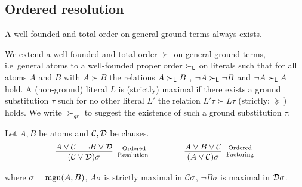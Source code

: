 \subsection{Ordered resolution}\label{sec:ordered:resolution}

\begin{lemma}A well-founded and total order on general ground terms always exists.\end{lemma}

\begin{definition}\label{def:orders-on-literals}
	We extend a well-founded and total order $\succ$ on general ground terms, 
	i.e~general atoms to a well-founded proper order $\succ_{\mathsf L}$ 
	on literals such that for all atoms $A$ and $B$ with $A\succ B$ 
	the relations $A\succ_{\mathsf L} B$ , 
	$\lnot A\succ_{\mathsf L}\lnot B$ and 
	$\lnot A\succ_{\mathsf L} A$ hold. 
	A (non-ground) literal $L$ is {\myem (strictly) maximal} if there exists a ground substitution $\tau$ 
	such for no other literal $L'$ the relation $L'\tau\succ L\tau$ (strictly: $\succcurlyeq$) holds.
	We write $\succ_{gr}$ to suggest the existence of such a ground substitution $\tau$.
\end{definition}

\begin{definition}\label{def:ordered:resolution} 
	Let $A, B$ be atoms and ${\mathcal C},{\mathcal D}$ be clauses.
	\begin{gather*}
	\infer
	[\text{Ordered}\atop\text{Resolution	}] 
	{(\mcC\lor\mcD)\sigma}
	{A\lor\mcC&\lnot B\lor\mcD}
	\qquad\qquad
	\infer
	[\text{Ordered}\atop\text{Factoring}] 
	{(A\lor\mcC)\sigma}
	{A\lor B\lor\mcC}
	\end{gather*}
	\begin{center}
		where $\sigma=\operatorname{mgu}(A,B)$, 
		$A\sigma$ is strictly maximal in ${\mathcal C}\sigma$, 
		$\lnot B\sigma$ is maximal in ${\mathcal D}\sigma$.
	\end{center}
\end{definition}


